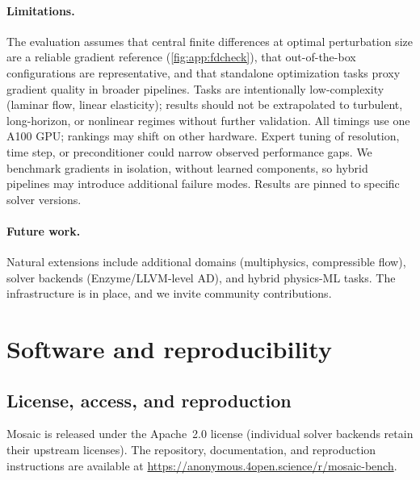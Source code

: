 \documentclass{article}
\begin{document}
\paragraph{Limitations.}
The evaluation assumes that central finite differences at optimal
perturbation size are a reliable gradient reference
(\cref{fig:app:fdcheck}), that out-of-the-box configurations are
representative, and that standalone optimization tasks proxy gradient
quality in broader pipelines.
Tasks are intentionally low-complexity (laminar flow, linear elasticity);
results should not be extrapolated to turbulent, long-horizon, or
nonlinear regimes without further validation.
All timings use one A100 GPU; rankings may shift on other hardware.
Expert tuning of resolution, time step, or preconditioner could narrow
observed performance gaps.
We benchmark gradients in isolation, without learned components, so
hybrid pipelines may introduce additional failure modes.
Results are pinned to specific solver versions.

\paragraph{Future work.}
Natural extensions include additional domains (multiphysics, compressible
flow), solver backends (Enzyme/LLVM-level AD), and hybrid physics-ML tasks.
The infrastructure is in place, and we invite community contributions.


\clearpage

{\small


}

\clearpage

\appendix

\section{Software and reproducibility}
\label{app:software}

\subsection{License, access, and reproduction}

Mosaic is released under the Apache~2.0 license (individual solver backends
retain their upstream licenses). The repository, documentation, and
reproduction instructions are available at
\url{https://anonymous.4open.science/r/mosaic-bench}.
\end{document}
